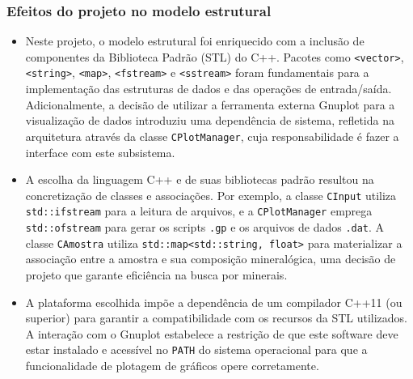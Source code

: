\subsubsection*{Efeitos do projeto no modelo estrutural}
\begin{itemize}
    \item Neste projeto, o modelo estrutural foi enriquecido com a inclusão de componentes da Biblioteca Padrão (STL) do C++. Pacotes como \texttt{<vector>}, \texttt{<string>}, \texttt{<map>}, \texttt{<fstream>} e \texttt{<sstream>} foram fundamentais para a implementação das estruturas de dados e das operações de entrada/saída. Adicionalmente, a decisão de utilizar a ferramenta externa Gnuplot para a visualização de dados introduziu uma dependência de sistema, refletida na arquitetura através da classe \texttt{CPlotManager}, cuja responsabilidade é fazer a interface com este subsistema.

    \item A escolha da linguagem C++ e de suas bibliotecas padrão resultou na concretização de classes e associações. Por exemplo, a classe \texttt{CInput} utiliza \texttt{std::ifstream} para a leitura de arquivos, e a \texttt{CPlotManager} emprega \texttt{std::ofstream} para gerar os scripts \texttt{.gp} e os arquivos de dados \texttt{.dat}. A classe \texttt{CAmostra} utiliza \texttt{std::map<std::string, float>} para materializar a associação entre a amostra e sua composição mineralógica, uma decisão de projeto que garante eficiência na busca por minerais.

    \item A plataforma escolhida impõe a dependência de um compilador C++11 (ou superior) para garantir a compatibilidade com os recursos da STL utilizados. A interação com o Gnuplot estabelece a restrição de que este software deve estar instalado e acessível no \texttt{PATH} do sistema operacional para que a funcionalidade de plotagem de gráficos opere corretamente.
\end{itemize}

